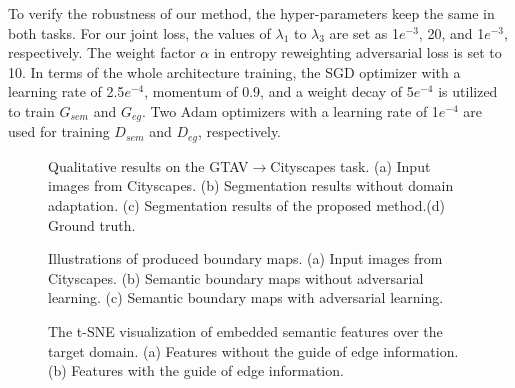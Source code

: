 \documentclass[sigconf]{acmart}
\begin{document}
\par To verify the robustness of our method, the hyper-parameters keep the same in both tasks. For our joint loss, the values of $\lambda_{1}$ to $\lambda_{3}$ are set as 1$e^{-3}$, 20, and 1$e^{-3}$, respectively. The weight factor $\alpha$ in entropy reweighting adversarial loss is set to 10. In terms of the whole architecture training, the SGD optimizer with a learning rate of 2.5$e^{-4}$, momentum of 0.9, and a weight decay of 5$e^{-4}$ is utilized to train $G_{sem}$ and $G_{eg}$. Two Adam optimizers with a learning rate of 1$e^{-4}$ are used for training $D_{sem}$ and $D_{eg}$, respectively.

\begin{figure*}[!t]
    \centering
    \centering
    \centering
    \centering
    \caption{Qualitative results on the GTAV$\rightarrow$Cityscapes task. (a) Input images from Cityscapes. (b) Segmentation results without domain adaptation. (c) Segmentation results of the proposed method.(d) Ground truth.}
    \label{fig:3}
\end{figure*}

\begin{figure}[!t]
    \centering
    \caption{Illustrations of produced boundary maps. (a) Input images from Cityscapes. (b) Semantic boundary maps without adversarial learning. (c) Semantic boundary maps with adversarial learning.}
    \label{fig:4}
\end{figure}
\begin{figure}[!t]
    \centering
    \centering
    \caption{The t-SNE visualization of embedded semantic features over the target domain. (a) Features without the guide of edge information. (b) Features with the guide of edge information.}
    \label{fig:5}
\end{figure}
\end{document}
